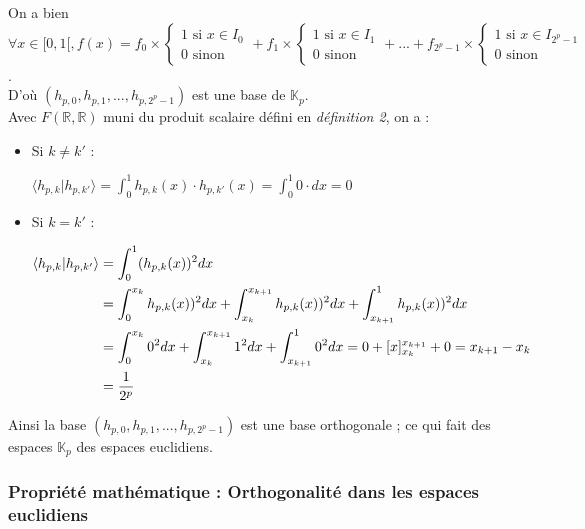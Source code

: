 \documentclass{article}
\begin{document}
On a bien $\forall x \in [0,1[, f(x) = f_0 \times \begin{cases} 1 \text{ si } x \in I_0 \\ 0 \text{ sinon } \end{cases}
+ f_1 \times \begin{cases} 1 \text{ si } x \in I_1 \\ 0 \text{ sinon } \end{cases}
+ ... +
f_{2^p - 1} \times \begin{cases} 1 \text{ si } x \in I_{2^p - 1} \\ 0 \text{ sinon } \end{cases} $.\\

D'où $(h_{p,0},h_{p,1},...,h_{p,2^p -1})$ est une base de $\mathbb{K}_p$.\\


Avec $F(\mathbb{R},\mathbb{R})$ muni du produit scalaire défini en \textit{définition 2}, on a : \\

\begin{itemize}

\item Si $k \neq k'$ :

$\displaystyle \langle h_{p,k}|h_{p,k'} \rangle = \int_{0}^{1} h_{p,k}(x)\cdot{}h_{p,k'}(x) = \int_0^1 0\cdot{}dx = 0$ \\

\item Si $k = k'$ :

\begin{align*} \displaystyle
\langle h_{p,k}|h_{p,k'} \rangle &= \int_{0}^{1} (h_{p,k}(x))^2 dx \\
 &= \int_{0}^{x_k} h_{p,k}(x))^2 dx + \int_{x_k}^{x_{k+1}} h_{p,k}(x))^2 dx + \int_{x_{k+1}}^{1} h_{p,k}(x))^2 dx  \\
\displaystyle &= \int_0^{x_k} 0^2 dx + \int_{x_k}^{x_{k+1}} 1^2 dx + \int_{x_{k+1}}^{1} 0^2 dx = 0 + [x]_{x_k}^{x_{k+1}} + 0 = x_{k+1} - x_k  \\
\displaystyle &= \frac{1}{2^p} \\
\end{align*} 
\end{itemize}

Ainsi la base $(h_{p,0},h_{p,1},...,h_{p,2^p -1})$ est une base orthogonale ; ce qui fait des espaces $\mathbb{K}_p$ des espaces euclidiens.


\subsubsection{Propriété mathématique : Orthogonalité dans les espaces euclidiens}
\end{document}
